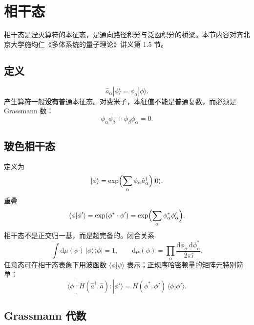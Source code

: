 \section{相干态}

相干态是湮灭算符的本征态，是通向路径积分与泛函积分的桥梁。本节内容对齐北京大学施均仁《多体系统的量子理论》讲义第 1.5 节。

\subsection{定义}

\begin{equation}
  \hat a_\alpha|\phi\rangle=\phi_\alpha|\phi\rangle.
\label{eq:coherent_def}
\end{equation}
产生算符一般\textbf{没有}普通本征态。对费米子，本征值不能是普通复数，而必须是 Grassmann 数：
\begin{equation}
  \phi_\alpha\phi_\beta+\phi_\beta\phi_\alpha=0.
\end{equation}

\subsection{玻色相干态}

定义为
\begin{equation}
  |\phi\rangle
  =\exp\Bigl(\sum_\alpha\phi_\alpha\hat a_\alpha^\dagger\Bigr)|0\rangle.
\end{equation}
重叠
\begin{equation}
  \langle\phi|\phi'\rangle
  =\exp(\phi^*\cdot\phi')
  =\exp\Bigl(\sum_\alpha\phi_\alpha^*\phi'_\alpha\Bigr).
\end{equation}
相干态不是正交归一基，而是超完备的。闭合关系
\begin{equation}
  \int\mathrm{d}\mu(\phi)\,|\phi\rangle\langle\phi|=1,
  \qquad
  \mathrm{d}\mu(\phi)
  =\prod_\alpha\frac{\mathrm{d}\phi_\alpha\,\mathrm{d}\phi_\alpha^*}{2\pi\mathrm{i}}.
\end{equation}
任意态可在相干态表象下用波函数 $\langle\phi|\psi\rangle$ 表示；正规序哈密顿量的矩阵元特别简单：
\begin{equation}
  \langle\phi|:H(\hat a^\dagger,\hat a):|\phi'\rangle
  =H(\phi^*,\phi')\,\langle\phi|\phi'\rangle.
\end{equation}

\subsection{Grassmann 代数}

